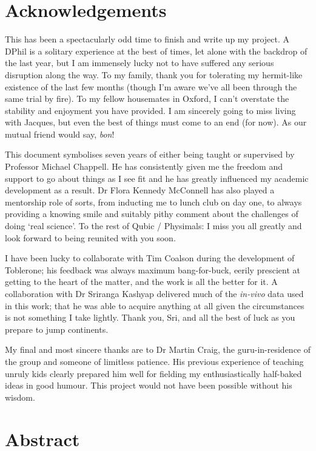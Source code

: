 \documentclass[12pt]{report}
\begin{document}
\chapter*{Acknowledgements}

This has been a spectacularly odd time to finish and write up my project. A DPhil is a solitary experience at the best of times, let alone with the backdrop of the last year, but I am immensely lucky not to have suffered any serious disruption along the way. To my family, thank you for tolerating my hermit-like existence of the last few months (though I'm aware we've all been through the same trial by fire). To my fellow housemates in Oxford, I can't overstate the stability and enjoyment you have provided. I am sincerely going to miss living with Jacques, but even the best of things must come to an end (for now). As our mutual friend would say, \textit{bon}! 

This document symbolises seven years of either being taught or supervised by Professor Michael Chappell. He has consistently given me the freedom and support to go about things as I see fit and he has greatly influenced my academic development as a result. Dr Flora Kennedy McConnell has also played a mentorship role of sorts, from inducting me to lunch club on day one, to always providing a knowing smile and suitably pithy comment about the challenges of doing `real science'. To the rest of Qubic / Physimals: I miss you all greatly and look forward to being reunited with you soon. 

I have been lucky to collaborate with Tim Coalson during the development of Toblerone; his feedback was always maximum bang-for-buck, eerily prescient at getting to the heart of the matter, and the work is all the better for it. A collaboration with Dr Sriranga Kashyap delivered much of the \textit{in-vivo} data used in this work; that he was able to acquire anything at all given the circumstances is not something I take lightly. Thank you, Sri, and all the best of luck as you prepare to jump continents. 

My final and most sincere thanks are to Dr Martin Craig, the guru-in-residence of the group and someone of limitless patience. His previous experience of teaching unruly kids clearly prepared him well for fielding my enthusiastically half-baked ideas in good humour. This project would not have been possible without his wisdom. 

\clearpage
\chapter*{Abstract}
\end{document}
